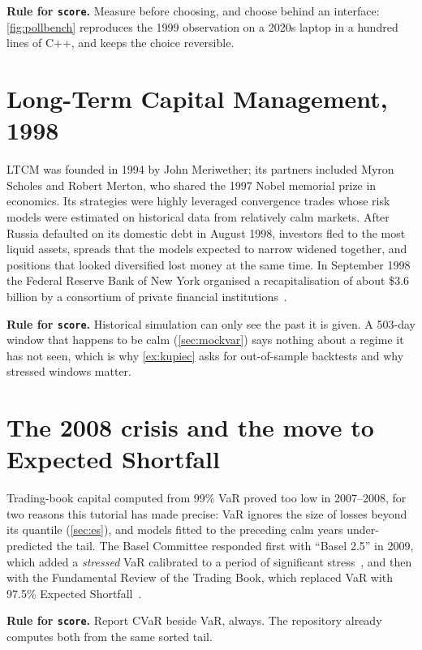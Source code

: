 \textbf{Rule for \texttt{score}.} Measure before choosing, and choose behind an interface: \cref{fig:pollbench} reproduces
the 1999 observation on a 2020s laptop in a hundred lines of C++, and  keeps the choice reversible.

\section{Long-Term Capital Management, 1998}\label{sec:hist-ltcm}
LTCM was founded in 1994 by John Meriwether; its partners included Myron Scholes and Robert Merton, who shared the 1997
Nobel memorial prize in economics. Its strategies were highly leveraged convergence trades whose risk models were
estimated on historical data from relatively calm markets. After Russia defaulted on its domestic debt in August 1998,
investors fled to the most liquid assets, spreads that the models expected to narrow widened together, and
positions that looked diversified lost money at the same time. In September 1998 the Federal Reserve Bank of New York
organised a recapitalisation of about \$3.6 billion by a consortium of private financial institutions~\cite{lowenstein2000genius}.

\textbf{Rule for \texttt{score}.} Historical simulation can only see the past it is given. A 503-day window that happens to
be calm (\cref{sec:mockvar}) says nothing about a regime it has not seen, which is why \cref{ex:kupiec} asks for out-of-sample
backtests and why stressed windows matter.

\section{The 2008 crisis and the move to Expected Shortfall}\label{sec:hist-2008}
Trading-book capital computed from 99\% VaR proved too low in 2007--2008, for two reasons this tutorial has made precise:
VaR ignores the size of losses beyond its quantile (\cref{sec:es}), and models fitted to the preceding calm years
under-predicted the tail. The Basel Committee responded first with ``Basel 2.5'' in 2009, which added a \emph{stressed}
VaR calibrated to a period of significant stress~\cite{bcbs2009revisions}, and then with the Fundamental Review of the
Trading Book, which replaced VaR with 97.5\% Expected Shortfall~\cite{bcbs2019frtb}.

\textbf{Rule for \texttt{score}.} Report CVaR beside VaR, always. The repository already computes both from the same sorted tail.

